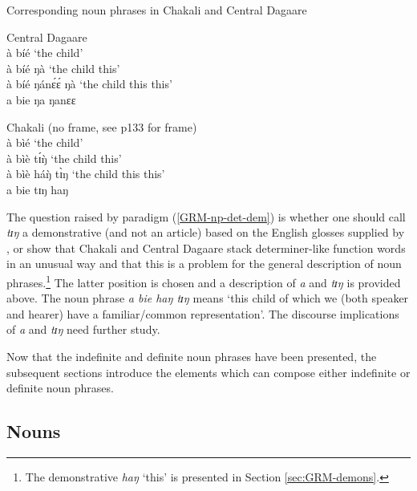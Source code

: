 \begin{exe}
\begin{exe}
\begin{exe}
{\begin{exe}
\begin{exe}
\begin{exe}
\begin{exe}
\ea\label{GRM-np-det-dem}{\rm Corresponding  noun phrases in Chakali and
Central  Dagaare} 

\begin{multicols}{2}

 \ea\label{GRM-np-det-dem-dag}{\rm Central Dagaare}\\
à bíé   `the child'\\
à bíé ŋà   `the child this'\\
à bíé  ŋánɛ́ɛ́ ŋà  `the child this this'\\
 \textasteriskcentered  a bie  ŋa ŋanɛɛ  

 \ex\label{GRM-np-det-dem-cli}{\rm Chakali}  (no frame, see p133 for frame)\\
à bìé   `the child'\\
à bìè tɪ́ŋ̀   `the child this'\\
à bìè háŋ̀ tɪ̀ŋ  `the child this this'\\
 \textasteriskcentered a bie  tɪŋ haŋ  

 
\z
\end{multicols}
 \z




The question raised by paradigm  (\ref{GRM-np-det-dem}) is  whether one
should call {\it tɪŋ} a demonstrative (and not an article) based  on the English
glosses  supplied by  \citet[47]{Bodo97}, or show that Chakali and Central
Dagaare stack determiner-like function words in an unusual way and that this is
a problem for the general description of noun phrases.\footnote{The
demonstrative {\it haŋ} `this' is presented in Section \ref {sec:GRM-demons}.}
The latter position is
chosen and a description of  {\it a} and {\it tɪŋ} is provided above. The
noun phrase {\it a bie haŋ tɪŋ} means `this child of which we (both speaker and
hearer)   have a familiar/common representation'.  The discourse implications
 of  {\it a} and  {\it tɪŋ}  need 
further study. 

Now that the indefinite and definite noun phrases have been presented, the
subsequent sections introduce the elements which can compose  either  indefinite
or  definite noun  phrases.




\subsection{Nouns}
\label{sec:GRM-noun}


\end{exe}
\end{exe}
\end{exe}
\end{exe}}
\end{exe}
\end{exe}
\end{exe}
